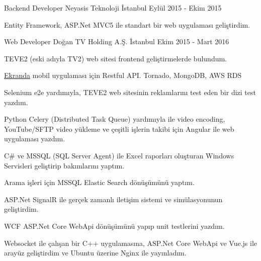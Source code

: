 
\begin{cventries}

    \cventry
        {Backend Developer}
        {Neyasis Teknoloji}
        {İstanbul}
        {Eylül 2015 - Ekim 2015}
        {
        \begin{cvitems}
            \item{Entity Framework, ASP.Net MVC5 ile standart bir web uygulaması geliştirdim. }
        \end{cvitems}
        }
        
        \cventry
        {Web Developer}
        {Doğan TV Holding A.Ş.}
        {İstanbul}
        {Ekim 2015 - Mart 2016}
        {
            \begin{cvitems}
                \item { TEVE2 (eski adıyla TV2) web sitesi frontend geliştirmelerde bulundum. }
                \item {\href{https://play.google.com/store/apps/details?id=dogantv.ekranda}{Ekranda} }
                { mobil uygulaması için Restful API. Tornado, MongoDB, AWS RDS}
                \item { Selenium e2e yardımıyla, TEVE2 web sitesinin reklamlarını test eden bir dizi test yazdım. }
                \item { Python Celery (Distributed Task Queue) yardımıyla ile video encoding, YouTube/SFTP video yükleme ve çeşitli işlerin takibi için Angular ile web uygulaması yazdım. }
            \end{cvitems}
        }
        
        {
            \begin{cvitems}
                \item{ C\# ve MSSQL (SQL Server Agent) ile Excel raporları oluşturan Windows Servisleri geliştirip bakımlarını yaptım. }
            \end{cvitems}
        }
        {
            \begin{cvitems}
                \item { Arama işleri için MSSQL Elastic Search dönüşümünü yaptım. }
                \item { ASP.Net SignalR ile gerçek zamanlı iletişim sistemi ve simülasyonunun geliştirdim.}
                \item { WCF ASP.Net Core WebApi dönüşümünü yapıp unit testlerini yazdım. }
                \item { Websocket ile çalışan bir C++ uygulamasına, ASP.Net Core WebApi ve Vue.js ile arayüz geliştirdim ve Ubuntu üzerine Nginx ile yayınladım. }
            \end{cvitems}
        }


\end{cventries}
